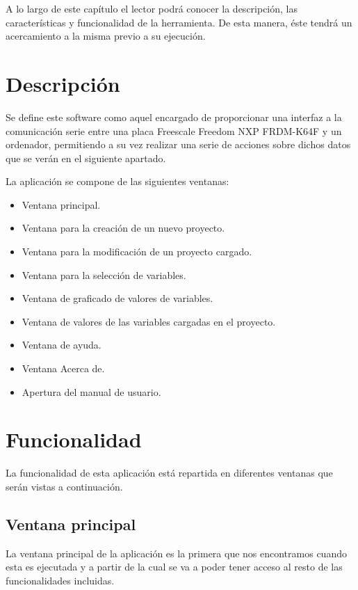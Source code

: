 
A lo largo de este capítulo el lector podrá conocer la descripción, las características y funcionalidad de la herramienta. De esta manera, éste tendrá un acercamiento a la misma previo a su ejecución.

\section{Descripción}

Se define este software como aquel encargado de proporcionar una interfaz a la comunicación serie entre una placa Freescale Freedom NXP FRDM-K64F y un ordenador, permitiendo a su vez realizar una serie de acciones sobre dichos datos que se verán en el siguiente apartado.

La aplicación se compone de las siguientes ventanas:
\begin{itemize}
	\item Ventana principal.
	\item Ventana para la creación de un nuevo proyecto.
	\item Ventana para la modificación de un proyecto cargado.
	\item Ventana para la selección de variables.
	\item Ventana de graficado de valores de variables.
	\item Ventana de valores de las variables cargadas en el proyecto.
	\item Ventana de ayuda.
	\item Ventana Acerca de.
	\item Apertura del manual de usuario.
\end{itemize}

\section{Funcionalidad}

La funcionalidad de esta aplicación está repartida en diferentes ventanas que serán vistas a continuación.

\subsection{Ventana principal}

La ventana principal de la aplicación es la primera que nos encontramos cuando esta es ejecutada y a partir de la cual se va a poder tener acceso al resto de las funcionalidades incluidas.

